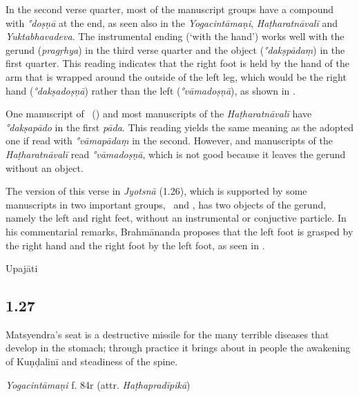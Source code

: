 \begin{ekdosis}
\begin{testimonia}[hp01_026]
\end{testimonia}

\begin{philcomm}[hp01_026]
In the second verse quarter, most of the manuscript groups have a compound with \emph{°doṣṇā} at the end, as seen also in the \emph{Yogacintāmaṇi}, \emph{Haṭharatnāvalī} and \emph{Yuktabhavadeva}. The instrumental ending (`with the hand') works well with the gerund (\emph{pragṛhya}) in the third verse quarter and the object (\emph{°dakṣpādaṃ}) in the first quarter. This reading indicates that the right foot is held by the hand of the arm that is wrapped around the outside of the left leg, which would be the right hand (\emph{°dakṣadoṣṇā}) rather than the left (\emph{°vāmadoṣṇā}), as shown in .

One manuscript of \textalpha\ () and most manuscripts of the \textit{Haṭharatnāvalī} have \emph{°dakṣapādo} in the first \emph{pāda}. This reading yields the same meaning as the adopted one if read with \emph{°vāmapādaṃ} in the second. However,  and manuscripts of the \textit{Haṭharatnāvalī} read \emph{°vāmadoṣṇā}, which is not good because it leaves the gerund without an object.

The version of this verse in \emph{Jyotsnā} (1.26), which is supported by some manuscripts in two important groups, \textbeta\ and \texteta, has two objects of the gerund, namely the left and right feet, without an instrumental or conjuctive particle. In his commentarial remarks, Brahmānanda proposes that the left foot is grasped by the right hand and the right foot by the left foot, as seen in .
\end{philcomm}

\begin{metre}[hp01_026]
Upajāti
\end{metre}

\subsection*{1.27}
\begin{translation}[hp01_027]
Matsyendra's seat is a destructive missile for the many terrible diseases that develop in the stomach; through practice it brings about in people the awakening of Kuṇḍalinī and steadiness of the spine.
\end{translation}

\begin{testimonia}[hp01_027]
\emph{Yogacintāmaṇi} f. 84r (attr. \emph{Haṭhapradīpikā})


\end{testimonia}
\end{ekdosis}

